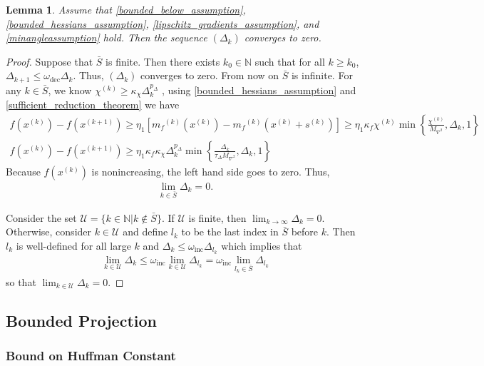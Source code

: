 \documentclass{article}
\newtheorem{lemma}[theorem]{Lemma}
\theoremstyle{case}
\numberwithin{theorem}{subsection}
\newcommand{\chik}{{\chi^{(k)}}}
\newcommand{\dk}{\Delta_k}
\newcommand{\dkpo}{\Delta_{k+1}}
\newcommand{\maxhessian}{{M_{\nabla^2}}}
\newcommand{\mfk}{{{m}_f}^{(k)}}
\newcommand{\naturals}{\mathbb N}
\newcommand{\oalpha}{\tau_{\Delta}}
\newcommand{\omegadec}{\omega_{\text{dec}}}
\newcommand{\omegainc}{\omega_{\text{inc}}}
\newcommand{\sk}{{{s}^{(k)}}}
\newcommand{\xkpo}{{{x}^{(k+1)}}}
\newcommand{\xk}{{x^{(k)}}}
\begin{document}
\begin{lemma}
\label{delta_to_zero}
Assume that
\cref{bounded_below_assumption},
\cref{bounded_hessians_assumption},
\cref{lipschitz_gradients_assumption},
and \cref{minangleassumption} hold.
Then the sequence $(\dk)$ converges to zero.
\end{lemma}
 

\begin{proof}

Suppose that $\bar{S}$ is finite. Then there exists $k_0 \in \naturals$ such that for all $k \ge  k_0$, $\dkpo \le \omegadec \dk$.
Thus, $(\dk)$ converges to zero.
From now on $\bar{S}$ is infinite.  
For any $k \in \bar{S}$, we know $\chik \ge \kappa_{\chi}\dk^{p_{\Delta}}$ , using \cref{bounded_hessians_assumption} and \cref{sufficient_reduction_theorem} we have
\begin{align*}
f\left(\xk\right) - f\left(\xkpo\right) \ge \eta_1 \left[\mfk\left(\xk\right) - \mfk\left(\xk + \sk\right)\right] \ge \eta_1 \kappa_f \chik \min\left\{\frac{\chik}{\maxhessian}, \dk, 1\right\}\\
f\left(\xk\right) - f\left(\xkpo\right) \ge \eta_1\kappa_f \kappa_{\chi}\dk^{p_{\Delta}}\min\left\{\frac{\dk}{\oalpha \maxhessian}, \dk, 1\right\}
\end{align*}
Because $f\left(\xk\right)$ is nonincreasing, the left hand side goes to zero.
Thus,
\begin{align}
\lim_{k \in \bar{S}} \dk = 0.
\end{align}

Consider the set
$\mathcal U = \{ k \in \naturals | k \not \in \bar S \}$.
If $\mathcal U$ is finite, then $\lim_{k\to\infty}\dk = 0$.
Otherwise, consider $k \in \mathcal U$ and define $l_k$ to be the last index in $\bar S$ before $k$.
Then $l_k$ is well-defined for all large $k$  and $\dk \le \omegainc \Delta_{l_k}$ which implies that
\begin{align}
\lim_{k \in \mathcal U } \dk \le \omegainc \lim_{k \in \mathcal U} \Delta_{l_k} = \omegainc \lim_{l_k \in \bar{S}} \Delta_{l_k}
\end{align}
so that $\lim_{k \in \mathcal U} \dk = 0$.
\end{proof}

\subsection{Bounded Projection}

\subsubsection{Bound on Huffman Constant}
\end{document}
